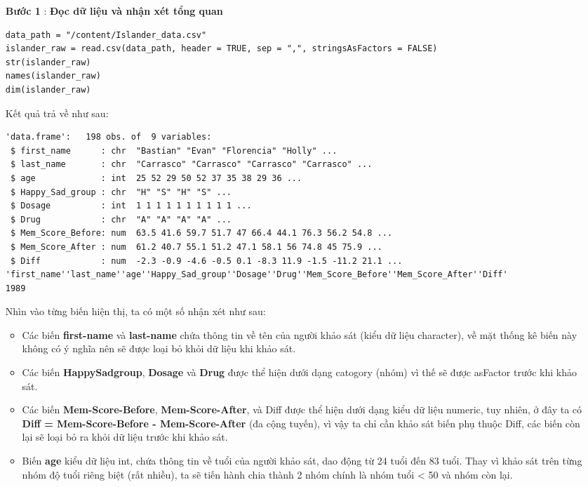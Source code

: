 \begin{itemize}
    \item [\textbf{Bước 1}]: \textbf{Đọc dữ liệu và nhận xét tổng quan}
    \newpage
    \begin{lstlisting}
data_path = "/content/Islander_data.csv"
islander_raw = read.csv(data_path, header = TRUE, sep = ",", stringsAsFactors = FALSE)
str(islander_raw)
names(islander_raw)
dim(islander_raw)
    \end{lstlisting}

    Kết quả trả về như sau:

    \begin{lstlisting}
'data.frame':	198 obs. of  9 variables:
 $ first_name      : chr  "Bastian" "Evan" "Florencia" "Holly" ...
 $ last_name       : chr  "Carrasco" "Carrasco" "Carrasco" "Carrasco" ...
 $ age             : int  25 52 29 50 52 37 35 38 29 36 ...
 $ Happy_Sad_group : chr  "H" "S" "H" "S" ...
 $ Dosage          : int  1 1 1 1 1 1 1 1 1 1 ...
 $ Drug            : chr  "A" "A" "A" "A" ...
 $ Mem_Score_Before: num  63.5 41.6 59.7 51.7 47 66.4 44.1 76.3 56.2 54.8 ...
 $ Mem_Score_After : num  61.2 40.7 55.1 51.2 47.1 58.1 56 74.8 45 75.9 ...
 $ Diff            : num  -2.3 -0.9 -4.6 -0.5 0.1 -8.3 11.9 -1.5 -11.2 21.1 ...
'first_name''last_name''age''Happy_Sad_group''Dosage''Drug''Mem_Score_Before''Mem_Score_After''Diff'
1989
    \end{lstlisting}

    Nhìn vào từng biến hiện thị, ta có một số nhận xét như sau:
        \begin{itemize}
            \item Các biến \textbf{first-name} và \textbf{last-name} chứa thông tin về tên của người khảo sát (kiểu dữ liệu character), về mặt thống kê biến này không có ý nghĩa nên sẽ được loại bỏ khỏi dữ liệu khi khảo sát.
            \item Các biến \textbf{HappySadgroup}, \textbf{Dosage} và \textbf{Drug} được thể hiện dưới dạng catogory (nhóm) vì thế sẽ được asFactor trước khi khảo sát.
            \item Các biến \textbf{Mem-Score-Before}, \textbf{Mem-Score-After}, và Diff được thể hiện dưới dạng kiểu dữ liệu numeric, tuy nhiên, ở đây ta có \textbf{Diff = Mem-Score-Before - Mem-Score-After} (đa cộng tuyến), vì vậy ta chỉ cần khảo sát biến phụ thuộc Diff, các biến còn lại sẽ loại bỏ ra khỏi dữ liệu trước khi khảo sát.
            \item Biến \textbf{age} kiểu dữ liệu int, chứa thông tin về tuổi của người khảo sát, dao động từ 24 tuổi đến 83 tuổi. Thay vì khảo sát trên từng nhóm độ tuổi riêng biệt (rất nhiều), ta sẽ tiến hành chia thành 2 nhóm chính là nhóm tuổi < 50 và nhóm còn lại.
        \end{itemize}


\end{itemize}
